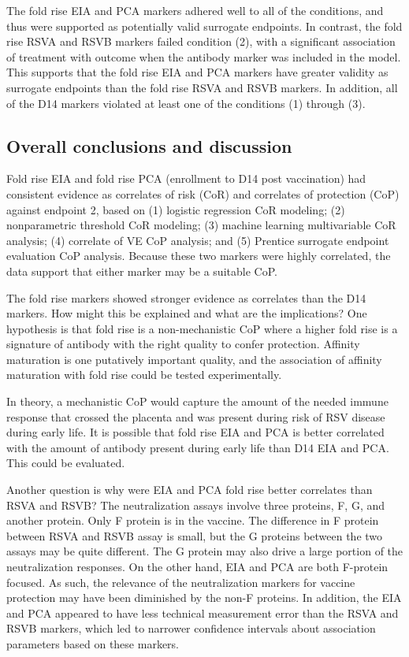 \documentclass[11pt]{article}
\begin{document}
The fold rise EIA and PCA markers adhered well to all of the conditions, and thus were supported as potentially valid surrogate endpoints.
In contrast, the fold rise RSVA and RSVB markers failed condition (2), with a significant association of treatment with outcome when the antibody marker was included in the model. This supports that the fold rise EIA and PCA markers have greater validity as surrogate endpoints than the fold rise RSVA and RSVB markers. In addition, all of the D14 markers violated at least one of the conditions (1) through (3).

\hypertarget{overall-conclusions-and-discussion}{%
\subsection{Overall conclusions and discussion}\label{overall-conclusions-and-discussion}}

Fold rise EIA and fold rise PCA (enrollment to D14 post vaccination) had consistent evidence as correlates of risk (CoR) and correlates of protection (CoP) against endpoint 2, based on (1) logistic regression CoR modeling; (2) nonparametric threshold CoR modeling; (3) machine learning multivariable CoR analysis; (4) correlate of VE CoP analysis; and (5) Prentice surrogate endpoint evaluation CoP analysis. Because these two markers were highly correlated, the data support that either marker may be a suitable CoP.

The fold rise markers showed stronger evidence as correlates than the D14 markers. How might this be explained and what are the implications? One hypothesis is that
fold rise is a non-mechanistic CoP where a higher fold rise is a signature of antibody with the right quality to confer protection. Affinity maturation is one putatively important quality, and the association of affinity maturation with fold rise could be tested experimentally.

In theory, a mechanistic CoP would capture the amount of the needed immune response that crossed the placenta and was present during risk of RSV disease during early life. It is possible that fold rise EIA and PCA is better correlated with the amount of antibody present during early life than D14 EIA and PCA. This could be evaluated.

Another question is why were EIA and PCA fold rise better correlates than RSVA and RSVB? The neutralization assays involve three proteins, F, G, and another protein. Only F protein is in the vaccine. The difference in F protein between RSVA and RSVB assay is small, but the G proteins between the two assays may be quite different. The G protein may also drive a large portion of the neutralization responses. On the other hand, EIA and PCA are both F-protein focused. As such, the relevance of the neutralization markers for vaccine protection may have been diminished by the non-F proteins. In addition, the EIA and PCA appeared to have less technical measurement error than the RSVA and RSVB markers, which led to narrower confidence intervals about association parameters based on these markers.
\end{document}
